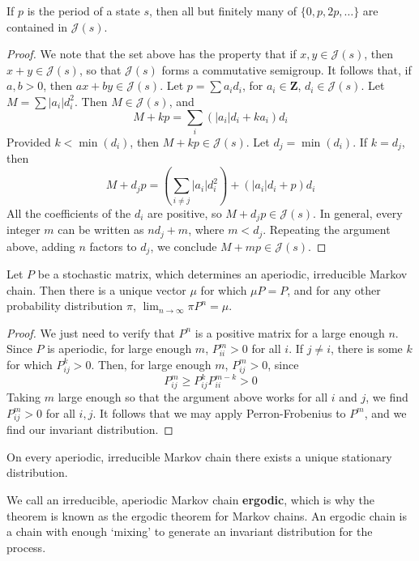 \begin{theorem}
    If $p$ is the period of a state $s$, then all but finitely many of $\{ 0, p, 2p, \dots \}$ are contained in $\mathcal{J}(s)$.
\end{theorem}
\begin{proof}
    We note that the set above has the property that if $x,y \in \mathcal{J}(s)$, then $x + y \in \mathcal{J}(s)$, so that $\mathcal{J}(s)$ forms a commutative semigroup. It follows that, if $a,b > 0$, then $ax + by \in \mathcal{J}(s)$. Let $p = \sum a_i d_i$, for $a_i \in \mathbf{Z}$, $d_i \in \mathcal{J}(s)$. Let $M = \sum |a_i| d_i^2$. Then $M \in \mathcal{J}(s)$, and
    \[ M + kp = \sum_i (|a_i|d_i + ka_i) d_i \]
    Provided $k < \min(d_i)$, then $M + kp \in \mathcal{J}(s)$. Let $d_j = \min(d_i)$. If $k = d_j$, then
    \[ M + d_j p = \left( \sum_{i \neq j} |a_i|d_i^2 \right) + (|a_i|d_i + p)d_i \]
    All the coefficients of the $d_i$ are positive, so $M + d_j p \in \mathcal{J}(s)$. In general, every integer $m$ can be written as $nd_j + m$, where $m < d_j$. Repeating the argument above, adding $n$ factors to $d_j$, we conclude $M + mp \in \mathcal{J}(s)$.
\end{proof}

\begin{theorem}
    Let $P$ be a stochastic matrix, which determines an aperiodic, irreducible Markov chain. Then there is a unique vector $\mu$ for which $\mu P = P$, and for any other probability distribution $\pi$, $\lim_{n \to \infty} \pi P^n = \mu$.
\end{theorem}
\begin{proof}
    We just need to verify that $P^n$ is a positive matrix for a large enough $n$. Since $P$ is aperiodic, for large enough $m$, $P^m_{ii} > 0$ for all $i$. If $j \neq i$, there is some $k$ for which $P^k_{ij} > 0$. Then, for large enough $m$, $P^m_{ij} > 0$, since
    \[ P^m_{ij} \geq P^{k}_{ij} P^{m-k}_{ii} > 0 \]
    Taking $m$ large enough so that the argument above works for all $i$ and $j$, we find $P^m_{ij} > 0$ for all $i,j$. It follows that we may apply Perron-Frobenius to $P^m$, and we find our invariant distribution.
\end{proof}

\begin{corollary}
    On every aperiodic, irreducible Markov chain there exists a unique stationary distribution.
\end{corollary}

We call an irreducible, aperiodic Markov chain {\bf ergodic}, which is why the theorem is known as the ergodic theorem for Markov chains. An ergodic chain is a chain with enough `mixing' to generate an invariant distribution for the process.

